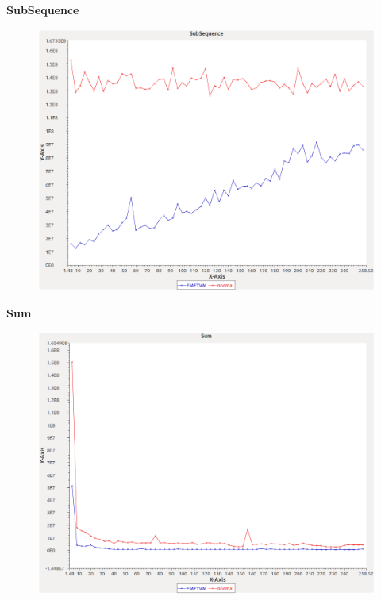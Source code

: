 \noindent\textbf{SubSequence}

\begin{figure}[h]
\centering
\includegraphics[width=\textwidth]{graphs/sequence/SubSequence}
\end{figure}
\pagebreak

\noindent\textbf{Sum}

\begin{figure}[h]
\centering
\includegraphics[width=\textwidth]{graphs/sequence/Sum}
\end{figure}
\pagebreak

